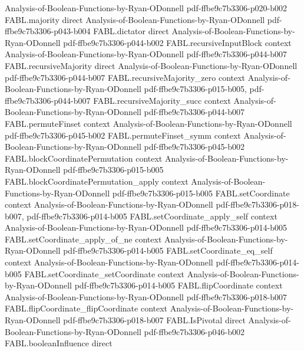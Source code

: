 \begin{theorem}
  {Analysis-of-Boolean-Functions-by-Ryan-ODonnell}
  {pdf-ffbe9c7b3306-p020-b002}
\proofstep
  {FABL.majority}
  {direct}
  {Analysis-of-Boolean-Functions-by-Ryan-ODonnell}
  {pdf-ffbe9c7b3306-p043-b004}
\proofstep
  {FABL.dictator}
  {direct}
  {Analysis-of-Boolean-Functions-by-Ryan-ODonnell}
  {pdf-ffbe9c7b3306-p044-b002}
\proofstep
  {FABL.recursiveInputBlock}
  {context}
  {Analysis-of-Boolean-Functions-by-Ryan-ODonnell}
  {pdf-ffbe9c7b3306-p044-b007}
\proofstep
  {FABL.recursiveMajority}
  {direct}
  {Analysis-of-Boolean-Functions-by-Ryan-ODonnell}
  {pdf-ffbe9c7b3306-p044-b007}
\proofstep
  {FABL.recursiveMajority_zero}
  {context}
  {Analysis-of-Boolean-Functions-by-Ryan-ODonnell}
  {pdf-ffbe9c7b3306-p015-b005,
    pdf-ffbe9c7b3306-p044-b007}
\proofstep
  {FABL.recursiveMajority_succ}
  {context}
  {Analysis-of-Boolean-Functions-by-Ryan-ODonnell}
  {pdf-ffbe9c7b3306-p044-b007}
\proofstep
  {FABL.permuteFinset}
  {context}
  {Analysis-of-Boolean-Functions-by-Ryan-ODonnell}
  {pdf-ffbe9c7b3306-p045-b002}
\proofstep
  {FABL.permuteFinset_symm}
  {context}
  {Analysis-of-Boolean-Functions-by-Ryan-ODonnell}
  {pdf-ffbe9c7b3306-p045-b002}
\proofstep
  {FABL.blockCoordinatePermutation}
  {context}
  {Analysis-of-Boolean-Functions-by-Ryan-ODonnell}
  {pdf-ffbe9c7b3306-p015-b005}
\proofstep
  {FABL.blockCoordinatePermutation_apply}
  {context}
  {Analysis-of-Boolean-Functions-by-Ryan-ODonnell}
  {pdf-ffbe9c7b3306-p015-b005}
\proofstep
  {FABL.setCoordinate}
  {context}
  {Analysis-of-Boolean-Functions-by-Ryan-ODonnell}
  {pdf-ffbe9c7b3306-p018-b007,
    pdf-ffbe9c7b3306-p014-b005}
\proofstep
  {FABL.setCoordinate_apply_self}
  {context}
  {Analysis-of-Boolean-Functions-by-Ryan-ODonnell}
  {pdf-ffbe9c7b3306-p014-b005}
\proofstep
  {FABL.setCoordinate_apply_of_ne}
  {context}
  {Analysis-of-Boolean-Functions-by-Ryan-ODonnell}
  {pdf-ffbe9c7b3306-p014-b005}
\proofstep
  {FABL.setCoordinate_eq_self}
  {context}
  {Analysis-of-Boolean-Functions-by-Ryan-ODonnell}
  {pdf-ffbe9c7b3306-p014-b005}
\proofstep
  {FABL.setCoordinate_setCoordinate}
  {context}
  {Analysis-of-Boolean-Functions-by-Ryan-ODonnell}
  {pdf-ffbe9c7b3306-p014-b005}
\proofstep
  {FABL.flipCoordinate}
  {context}
  {Analysis-of-Boolean-Functions-by-Ryan-ODonnell}
  {pdf-ffbe9c7b3306-p018-b007}
\proofstep
  {FABL.flipCoordinate_flipCoordinate}
  {context}
  {Analysis-of-Boolean-Functions-by-Ryan-ODonnell}
  {pdf-ffbe9c7b3306-p018-b007}
\proofstep
  {FABL.IsPivotal}
  {direct}
  {Analysis-of-Boolean-Functions-by-Ryan-ODonnell}
  {pdf-ffbe9c7b3306-p046-b002}
\proofstep
  {FABL.booleanInfluence}
  {direct}

\end{theorem}
